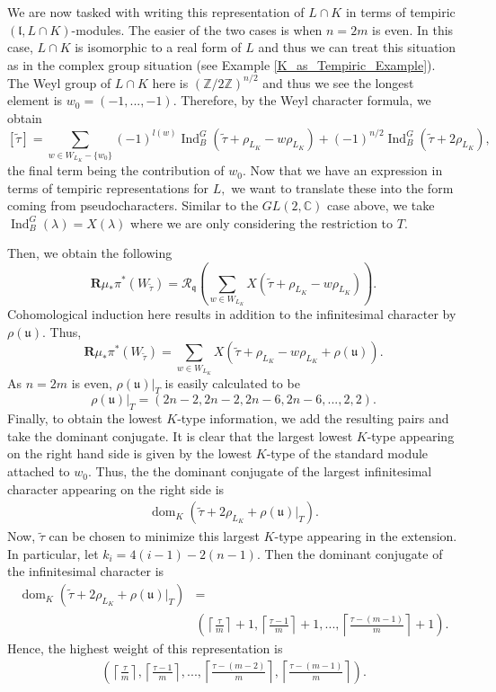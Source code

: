 \documentclass[letterpaper,twosided,11pt]{article}
\theoremstyle{plain}
\theoremstyle{definition}
\theoremstyle{remark}
\newcommand{\C}{\mathbb{C}}
\newcommand{\Z}{\mathbb{Z}}
\newcommand{\Ind}{\operatorname{Ind}}
\newcommand{\lie}[1]{\mathfrak{#1}}
\begin{document}
We are now tasked with writing this representation of $ L\cap K $ in
terms of tempiric $ (\lie{l},L\cap K) $-modules.  The easier of the two
cases is when $ n=2m $ is even.  In this case, $ L\cap K $ is isomorphic
to a real form of $ L $ and thus we can treat this situation as in the
complex group situation (see Example \ref{K_as_Tempiric_Example}).  The
Weyl group of $ L\cap K $ here is $ (\Z/2\Z)^{n/2} $ and thus we see the
longest element is $ w_0=(-1,...,-1). $ Therefore, by the Weyl character
formula, we obtain
\[
    [\tilde{\tau}]= \sum_{w\in W_{L_K}-\{w_0\}} (-1)^{l(w)} \Ind_{B}^G(
    \tilde{\tau}+\rho_{L_K}-w\rho_{L_K})+ (-1)^{n/2} \Ind_B^G(\tilde{\tau}+2\rho_
    {L_K}),
\]
the final term being the contribution of $ w_0. $ Now that we have an
expression in terms of tempiric representations for $ L, $ we want to
translate these into the form coming from pseudocharacters.  Similar to
the $ GL(2,\C) $ case above, we take $ \Ind_B^G(\lambda)=X(\lambda) $
where we are only considering the restriction to $ T. $

Then, we obtain the following
\[
    \textbf{R}\mu_*\pi^*(W_{\tilde{\tau}})=\mathcal{R}_{\lie{q}}\left(\sum_
    {w\in W_{L_K}} X\left(\tilde{\tau}+\rho_{L_K}-w\rho_{L_K}\right)\right).
\]
Cohomological induction here results in addition to the infinitesimal
character by $ \rho(\lie{u}). $ Thus,
\[
    \textbf{R}\mu_*\pi^*(W_{\tilde{\tau}})=\sum_{w\in W_{L_K}} X\left(\tilde
    {\tau}+\rho_{L_K}-w\rho_{L_K}+\rho(\lie{u}) \right).
\]
As $ n=2m $ is even, $ \rho(\lie{u})|_T $ is easily calculated to be
\[
    \rho(\lie{u})|_T=(2n-2,2n-2,2n-6,2n-6,...,2,2).
\]
Finally, to obtain the lowest $ K $-type information, we add the
resulting pairs and take the dominant conjugate.  It is clear that the
largest lowest $ K $-type appearing on the right hand side is given by
the lowest $ K $-type of the standard module attached to $ w_0. $ Thus,
the the dominant conjugate of the largest infinitesimal character appearing on the right side is
\begin{align*}
    \operatorname{dom}
    _K\left( \tilde{\tau}+2\rho_{L_K}+\rho(\lie{u})|_T \right).
\end{align*}
Now, $ \tilde{\tau} $ can be chosen to minimize this largest $ K $-type
appearing in the extension.  In particular, let $ k_i=4(i-1)-2(n-1). $
Then the dominant conjugate of the infinitesimal character is
\begin{align*}
    \operatorname{dom}
    _K\left( \tilde{\tau}+2\rho_{L_K}+\rho(\lie{u})|_T \right)&=\\
    &\left( \left\lceil \frac{\tau}{m} \right \rceil+1, \left\lceil
    \frac{\tau-1}{m} \right \rceil+1 ,...,\left\lceil \frac{\tau-(m-1)}{m}
    \right \rceil +1 \right).
\end{align*}
Hence, the highest weight of this representation is
\begin{align*}
    \left( \left\lceil \frac{\tau}{m} \right \rceil, \left\lceil \frac{\tau-1}
    {m} \right \rceil ,...,\left\lceil \frac{\tau-(m-2)}{m} \right
    \rceil ,\left\lceil \frac{\tau-(m-1)}{m} \right \rceil \right).
\end{align*}
\end{document}
